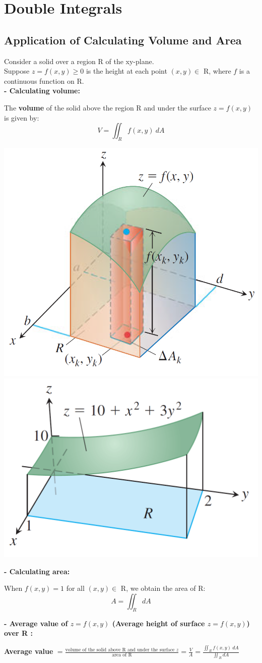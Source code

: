 \documentclass{article}
\begin{document}
\section{Double Integrals}
\subsection{Application of Calculating Volume and Area}
Consider a solid over a region R of the xy-plane.\\
Suppose $z=f(x,y)\ge 0$ is the height at each point $(x,y)\in$ R, where $f$ is a continuous function on R.\\
\textbf{- Calculating volume:}
\begin{mybox}
The \textbf{volume} of the solid above the region R and under the surface $z=f(x,y)$ is given by:
\begin{equation*}
      V=\displaystyle\iint_Rf(x,y)\ dA
\end{equation*}
\end{mybox}
\begin{center}
    \includegraphics[width=0.45\linewidth]{vo.png}
    \includegraphics[width=0.45\linewidth]{volume.png}
\end{center}
\textbf{- Calculating area:}
\begin{mybox}
When $f(x,y)=1$ for all $(x,y)\in$ R, we obtain the area of R:
\begin{equation*}
      A=\displaystyle\iint_R dA
\end{equation*}
\end{mybox}
\textbf{- Average value of $z=f(x,y)$ (Average height of surface $z=f(x,y)$)  over R :}
\begin{mybox}
    \begin{center}
        \textbf{Average value} $=\displaystyle\frac{\text{volume of the solid above R and under the surface $z$}}{\text{area of R}}
        =\frac{V}{A}
        =\frac{\displaystyle\iint_R f(x,y)\ dA}{\displaystyle\iint_R dA}$
    \end{center}
\end{mybox}
\end{document}
